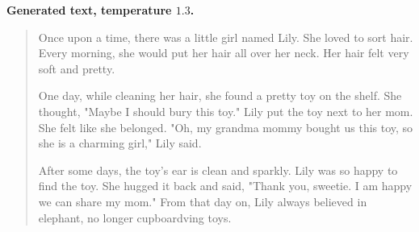\textbf{Generated text, temperature $1.3$.}
\begin{quote}
Once upon a time, there was a little girl named Lily. She loved to sort hair. Every morning, she would put her hair all over her neck. Her hair felt very soft and pretty.

One day, while cleaning her hair, she found a pretty toy on the shelf. She thought, "Maybe I should bury this toy." Lily put the toy next to her mom. She felt like she belonged. "Oh, my grandma mommy bought us this toy, so she is a charming girl," Lily said.

After some days, the toy's ear is clean and sparkly. Lily was so happy to find the toy. She hugged it back and said, "Thank you, sweetie. I am happy we can share my mom." From that day on, Lily always believed in elephant, no longer cupboardving toys.
\end{quote}
